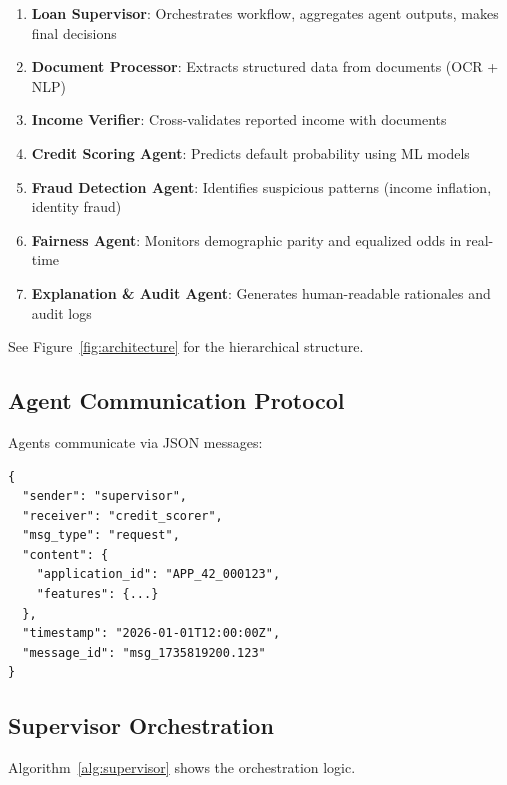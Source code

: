 \documentclass[11pt]{article}
\begin{document}
\begin{enumerate}
    \item \textbf{Loan Supervisor}: Orchestrates workflow, aggregates agent outputs, makes final decisions
    \item \textbf{Document Processor}: Extracts structured data from documents (OCR + NLP)
    \item \textbf{Income Verifier}: Cross-validates reported income with documents
    \item \textbf{Credit Scoring Agent}: Predicts default probability using ML models
    \item \textbf{Fraud Detection Agent}: Identifies suspicious patterns (income inflation, identity fraud)
    \item \textbf{Fairness Agent}: Monitors demographic parity and equalized odds in real-time
    \item \textbf{Explanation \& Audit Agent}: Generates human-readable rationales and audit logs
\end{enumerate}

See Figure~\ref{fig:architecture} for the hierarchical structure.

\subsection{Agent Communication Protocol}

Agents communicate via JSON messages:

\begin{verbatim}
{
  "sender": "supervisor",
  "receiver": "credit_scorer",
  "msg_type": "request",
  "content": {
    "application_id": "APP_42_000123",
    "features": {...}
  },
  "timestamp": "2026-01-01T12:00:00Z",
  "message_id": "msg_1735819200.123"
}
\end{verbatim}

\subsection{Supervisor Orchestration}

Algorithm~\ref{alg:supervisor} shows the orchestration logic.
\end{document}
